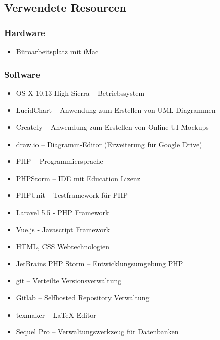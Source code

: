 \subsection{Verwendete Resourcen}
\label{app:Ressourcen}

\subsubsection{Hardware}

\begin{itemize}
	\item Büroarbeitsplatz mit iMac
\end{itemize}

\subsubsection{Software}

\begin{itemize}
	\item OS X 10.13 High Sierra – Betriebssystem
	\item LucidChart – Anwendung zum Erstellen von \acs{UML}-Diagrammen
	\item Creately – Anwendung zum Erstellen von Online-UI-Mockups
	\item draw.io – Diagramm-Editor (Erweiterung für Google Drive)
	\item PHP – Programmiersprache
	\item PHPStorm – IDE mit Education Lizenz
	\item PHPUnit – Testframework für PHP
	\item Laravel 5.5 - \acs{PHP} Framework
	\item Vue.js - Javascript Framework
	\item \acs{HTML}, \acs{CSS} Webtechnologien
	\item JetBrains PHP Storm – Entwicklungsumgebung \acs{PHP}
	\item git – Verteilte Versionsverwaltung
	\item Gitlab – Selfhosted Repository Verwaltung
	\item texmaker – \LaTeX\xspace Editor
	\item Sequel Pro – Verwaltungswerkzeug für Datenbanken
\end{itemize}